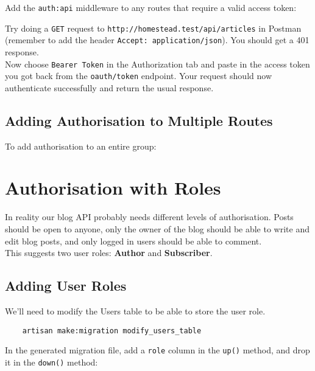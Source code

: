 Add the \texttt{auth:api} middleware to any routes that require a valid access token:


Try doing a \texttt{GET} request to \texttt{http://homestead.test/api/articles} in Postman (remember to add the header \texttt{Accept: application/json}). You should get a 401 response.
\\

Now choose \texttt{Bearer Token} in the Authorization tab and paste in the access token you got back from the \texttt{oauth/token} endpoint. Your request should now authenticate successfully and return the usual response.

\subsection{Adding Authorisation to Multiple Routes}

To add authorisation to an entire group:




\section{Authorisation with Roles}

In reality our blog API probably needs different levels of authorisation. Posts should be open to anyone, only the owner of the blog should be able to write and edit blog posts, and only logged in users should be able to comment.
\\

This suggests two user roles: \textbf{Author} and \textbf{Subscriber}.


\subsection{Adding User Roles}

We'll need to modify the Users table to be able to store the user role.

\begin{verbatim}
    artisan make:migration modify_users_table
\end{verbatim}

In the generated migration file, add a \texttt{role} column in the \texttt{up()} method, and drop it in the \texttt{down()} method:


